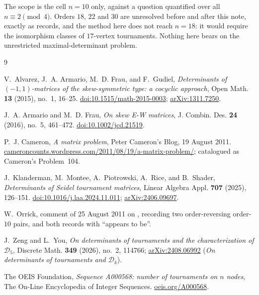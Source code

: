 \documentclass[11pt]{amsart}
\theoremstyle{remark}
\begin{document}
The scope is the cell $n=10$ only, against a question quantified over all
$n\equiv2\pmod4$. Orders $18$, $22$ and $30$ are unresolved before and after this note,
exactly as \cite{Alvarez2015} records, and the method here does not reach $n=18$: it would
require the isomorphism classes of $17$-vertex tournaments. Nothing here bears on the
unrestricted maximal-determinant problem.

\begin{thebibliography}{9}

V.~Alvarez, J.~A. Armario, M.~D. Frau, and F.~Gudiel,
\emph{Determinants of $(-1,1)$-matrices of the skew-symmetric type: a cocyclic approach},
Open Math. \textbf{13} (2015), no.~1, 16--25.
\href{https://doi.org/10.1515/math-2015-0003}{doi:10.1515/math-2015-0003};
\href{https://arxiv.org/abs/1311.7250}{arXiv:1311.7250}.

J.~A. Armario and M.~D. Frau,
\emph{On skew E-W matrices},
J. Combin. Des. \textbf{24} (2016), no.~5, 461--472.
\href{https://doi.org/10.1002/jcd.21519}{doi:10.1002/jcd.21519}.

P.~J. Cameron,
\emph{A matrix problem},
Peter Cameron's Blog, 19 August 2011.
\href{https://cameroncounts.wordpress.com/2011/08/19/a-matrix-problem/}%
{cameroncounts.wordpress.com/2011/08/19/a-matrix-problem/};
catalogued as Cameron's Problem~104.

J.~Klanderman, M.~Montee, A.~Piotrowski, A.~Rice, and B.~Shader,
\emph{Determinants of Seidel tournament matrices},
Linear Algebra Appl. \textbf{707} (2025), 126--151.
\href{https://doi.org/10.1016/j.laa.2024.11.011}{doi:10.1016/j.laa.2024.11.011};
\href{https://arxiv.org/abs/2406.09697}{arXiv:2406.09697}.

W.~Orrick,
comment of 25 August 2011 on \cite{Cameron2011},
recording two order-reversing order-$10$ pairs, and both records with ``appears to be''.

J.~Zeng and L.~You,
\emph{On determinants of tournaments and the characterization of $\mathcal D_5$},
Discrete Math. \textbf{349} (2026), no.~2, 114766;
\href{https://arxiv.org/abs/2408.06992}{arXiv:2408.06992} (\emph{On determinants of
tournaments and $\mathcal D_k$}).

The OEIS Foundation,
\emph{Sequence A000568: number of tournaments on $n$ nodes},
The On-Line Encyclopedia of Integer Sequences.
\href{https://oeis.org/A000568}{oeis.org/A000568}.

\end{thebibliography}
\end{document}
